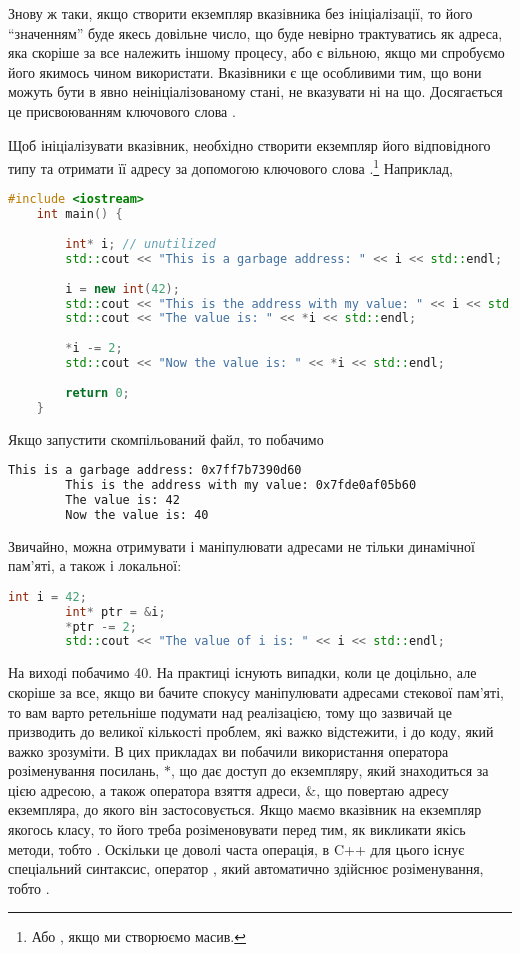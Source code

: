 \documentclass[12pt]{article}
\begin{document}
    Знову ж таки, якщо створити екземпляр вказівника без ініціалізації, то його ``значенням'' буде якесь довільне число, що буде невірно трактуватись як адреса, яка скоріше за все належить іншому процесу, або є вільною, якщо ми спробуємо його якимось чином використати. Вказівники є ще особливими тим, що вони можуть бути в явно неініціалізованому стані, не вказувати ні на що. Досягається це присвоюванням ключового слова .

    Щоб ініціалізувати вказівник, необхідно створити екземпляр його відповідного типу та отримати її адресу за допомогою ключового слова .\footnote{Або , якщо ми створюємо масив.} Наприклад,
    \begin{lstlisting}[language=c++,label=rawptr,caption="Сирі вказівники"]
    #include <iostream>
    int main() {
        
        int* i; // unutilized
        std::cout << "This is a garbage address: " << i << std::endl;
    
        i = new int(42);
        std::cout << "This is the address with my value: " << i << std::endl;
        std::cout << "The value is: " << *i << std::endl;
    
        *i -= 2;
        std::cout << "Now the value is: " << *i << std::endl;
    
        return 0;
    }
    \end{lstlisting}

    Якщо запустити скомпільований файл, то побачимо

    \begin{lstlisting}[language=sh]
        This is a garbage address: 0x7ff7b7390d60
        This is the address with my value: 0x7fde0af05b60
        The value is: 42
        Now the value is: 40
    \end{lstlisting}

    Звичайно, можна отримувати і маніпулювати адресами не тільки динамічної пам'яті, а також і локальної:
    \begin{lstlisting}[language=c++]
        int i = 42;
        int* ptr = &i;
        *ptr -= 2;
        std::cout << "The value of i is: " << i << std::endl;        
    \end{lstlisting}
    На виході побачимо 40. На практиці існують випадки, коли це доцільно, але скоріше за все, якщо ви бачите спокусу маніпулювати адресами стекової пам'яті, то вам варто ретельніше подумати над реалізацією, тому що зазвичай це призводить до великої кількості проблем, які важко відстежити, і до коду, який важко зрозуміти. В цих прикладах ви побачили використання оператора розіменування посилань, $*$, що дає доступ до екземпляру, який знаходиться за цією адресою, а також оператора взяття адреси, $\&$, що повертаю адресу екземпляра, до якого він застосовується. Якщо маємо вказівник на екземпляр якогось класу, то його треба розіменовувати перед тим, як викликати якісь методи, тобто . Оскільки це доволі часта операція, в C++ для цього існує спеціальний синтаксис, оператор \m{->}, який автоматично здійснює розіменування, тобто .
\end{document}

